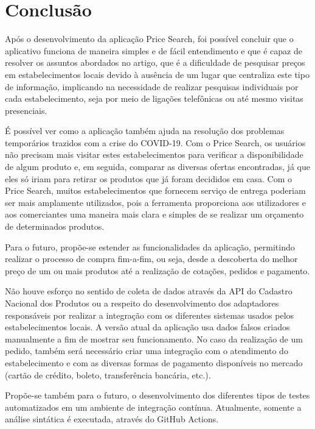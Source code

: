 \section{Conclusão}
\label{sec:conclusao}

Após o desenvolvimento da aplicação Price Search, foi possível concluir que o aplicativo funciona de maneira simples e de fácil entendimento e que é capaz de resolver os assuntos abordados no artigo, que é a dificuldade de pesquisar preços em estabelecimentos locais devido à ausência de um lugar que centraliza este tipo de informação, implicando na necessidade de realizar pesquisas individuais por cada estabelecimento, seja por meio de ligações telefônicas ou até mesmo visitas presenciais.

É possível ver como a aplicação também ajuda na resolução dos problemas temporários trazidos com a crise do COVID-19. Com o Price Search, os usuários não precisam mais visitar estes estabelecimentos para verificar a disponibilidade de algum produto e, em seguida, comparar as diversas ofertas encontradas, já que eles só iriam para retirar os produtos que já foram decididos em casa. Com o Price Search, muitos estabelecimentos que fornecem serviço de entrega poderiam ser mais amplamente utilizados, pois a ferramenta proporciona aos utilizadores e aos comerciantes uma maneira mais clara e simples de se realizar um orçamento de determinados produtos.

Para o futuro, propõe-se estender as funcionalidades da aplicação, permitindo realizar o processo de compra fim-a-fim, ou seja, desde a descoberta do melhor preço de um ou mais produtos até a realização de cotações, pedidos e pagamento.

Não houve esforço no sentido de coleta de dados através da API do Cadastro Nacional dos Produtos ou a respeito do desenvolvimento dos adaptadores responsáveis por realizar a integração com os diferentes sistemas usados pelos estabelecimentos locais. A versão atual da aplicação usa dados falsos criados manualmente a fim de mostrar seu funcionamento. No caso da realização de um pedido, também será necessário criar uma integração com o atendimento do estabelecimento e com as diversas formas de pagamento disponíveis no mercado (cartão de crédito, boleto, transferência bancária, etc.).

Propõe-se também para o futuro, o desenvolvimento dos diferentes tipos de testes automatizados em um ambiente de integração contínua. Atualmente, somente a análise sintática é executada, através do GitHub Actions.

